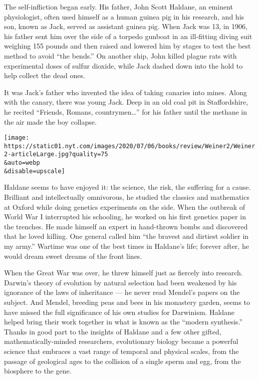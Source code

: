 The self-infliction began early. His father, John Scott Haldane, an
eminent physiologist, often used himself as a human guinea pig in his
research, and his son, known as Jack, served as assistant guinea pig.
When Jack was 13, in 1906, his father sent him over the side of a
torpedo gunboat in an ill-fitting diving suit weighing 155 pounds and
then raised and lowered him by stages to test the best method to avoid
``the bends.'' On another ship, John killed plague rats with
experimental doses of sulfur dioxide, while Jack dashed down into the
hold to help collect the dead ones.

It was Jack's father who invented the idea of taking canaries into
mines. Along with the canary, there was young Jack. Deep in an old coal
pit in Staffordshire, he recited ``Friends, Romans, countrymen\ldots{}''
for his father until the methane in the air made the boy collapse.

\texttt{[image: https://static01.nyt.com/images/2020/07/06/books/review/Weiner2/Weiner2-articleLarge.jpg?quality=75\\\&auto=webp\\\&disable=upscale]}

Haldane seems to have enjoyed it: the science, the risk, the suffering
for a cause. Brilliant and intellectually omnivorous, he studied the
classics and mathematics at Oxford while doing genetics experiments on
the side. When the outbreak of World War I interrupted his schooling, he
worked on his first genetics paper in the trenches. He made himself an
expert in hand-thrown bombs and discovered that he loved killing. One
general called him ``the bravest and dirtiest soldier in my army.''
Wartime was one of the best times in Haldane's life; forever after, he
would dream sweet dreams of the front lines.

When the Great War was over, he threw himself just as fiercely into
research. Darwin's theory of evolution by natural selection had been
weakened by his ignorance of the laws of inheritance --- he never read
Mendel's papers on the subject. And Mendel, breeding peas and bees in
his monastery garden, seems to have missed the full significance of his
own studies for Darwinism. Haldane helped bring their work together in
what is known as the ``modern synthesis.'' Thanks in good part to the
insights of Haldane and a few other gifted, mathematically-minded
researchers, evolutionary biology became a powerful science that
embraces a vast range of temporal and physical scales, from the passage
of geological ages to the collision of a single sperm and egg, from the
biosphere to the gene.


